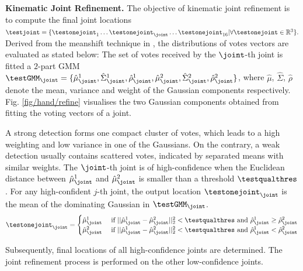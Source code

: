 \noindent\textbf{Kinematic Joint Refinement. } 
The objective of kinematic joint refinement is to compute the final joint locations $\testjoint = \{ \testonejoint_{1} \dots \testonejoint_{\joint} \dots \testonejoint_{16} | \forall \testonejoint \in \mathbb{R}^{3}\}. $
Derived from the meanshift technique in \cite{Girshick2011}, the distributions of votes vectors are evaluated as stated below: 
The set of votes received by the $\joint$-th joint is fitted a $2$-part GMM $\testGMM_{\joint} = \{ \hat{\mu}_{\joint}^{1}, \hat{\Sigma}_{\joint}^{1}, \hat{\rho}_{\joint}^{1}, \hat{\mu}_{\joint}^{2}, \hat{\Sigma}_{\joint}^{2}, \hat{\rho}_{\joint}^{2} \}$, where $\hat{\mu}$, $\hat{\Sigma}$, $\hat{\rho}$ denote the mean, variance and weight of the Gaussian components respectively. Fig. \ref{fig/hand/refine} visualises the two Gaussian components obtained from fitting the voting vectors of a joint.  

A strong detection forms one compact cluster of votes, which leads to a high weighting and low variance in one of the Gaussians. 
On the contrary, a weak detection usually contains scattered votes, indicated by separated means with similar weights. 
The $\joint$-th joint is of high-confidence 
when the Euclidean distance between $\hat{\mu}_{\joint}^{1}$ and $\hat{\mu}_{\joint}^{2}$ is smaller than a threshold $\testqualthres$. 
For any high-confident $j$-th joint, the output location $\testonejoint_{\joint}$ is the mean of the dominating Gaussian in $\testGMM_{\joint}$.  
\begin{equation}
	\testonejoint_{\joint} = 
	\begin{cases}
		\hat{\mu}_{\joint}^{1} & \mbox{ if } ||\hat{\mu}_{\joint}^{1} - \hat{\mu}_{\joint}^{2}||^2_2 < \testqualthres \mbox{ and } \hat{\rho}_{\joint}^{1} \ge \hat{\rho}_{\joint}^{2} \\  
		\hat{\mu}_{\joint}^{2} & \mbox{ if } ||\hat{\mu}_{\joint}^{1} - \hat{\mu}_{\joint}^{2}||^2_2 < \testqualthres \mbox{ and } \hat{\rho}_{\joint}^{1} < \hat{\rho}_{\joint}^{2} \\  
	\end{cases}
	\label{eq:highconf}
\end{equation}

Subsequently, final locations of all high-confidence joints are determined. The joint refinement process is performed on the other low-confidence joints.   

